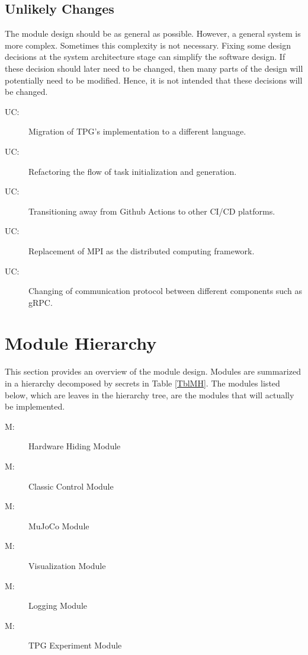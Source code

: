 \documentclass[12pt, titlepage]{article}
\newcounter{ucnum}
\newcommand{\uctheucnum}{UC\theucnum}
\newcounter{mnum}
\newcommand{\mthemnum}{M\themnum}
\begin{document}
\subsection{Unlikely Changes} \label{SecUchange}

The module design should be as general as possible. However, a general system is
more complex. Sometimes this complexity is not necessary. Fixing some design
decisions at the system architecture stage can simplify the software design. If
these decision should later need to be changed, then many parts of the design
will potentially need to be modified. Hence, it is not intended that these
decisions will be changed.

\begin{description}
  \item[ \uctheucnum \label{ucControl1}:] Migration of TPG's implementation to a different language.
  \item[ \uctheucnum \label{ucControl2}:] Refactoring the flow of task initialization and generation.
  \item[ \uctheucnum \label{ucVerify1}:] Transitioning away from Github Actions to other CI/CD platforms.
  \item[ \uctheucnum \label{ucControl3}:] Replacement of MPI as the distributed computing framework.
  \item[ \uctheucnum \label{ucControl4}:] Changing of communication protocol between different components such as gRPC.
\end{description}

\section{Module Hierarchy} \label{SecMH}

This section provides an overview of the module design. Modules are summarized
in a hierarchy decomposed by secrets in Table \ref{TblMH}. The modules listed
below, which are leaves in the hierarchy tree, are the modules that will
actually be implemented.

\begin{description}
\item [ \mthemnum \label{mHH}:] Hardware Hiding Module
\item [ \mthemnum \label{mClassicControl}:] Classic Control Module
\item [ \mthemnum \label{mMuJoCo}:] MuJoCo Module
\item [ \mthemnum \label{mVisualization}:] Visualization Module
\item [ \mthemnum \label{mLogging}:] Logging Module
\item [ \mthemnum \label{mExperiment}:] TPG Experiment Module
\end{description}
\end{document}
